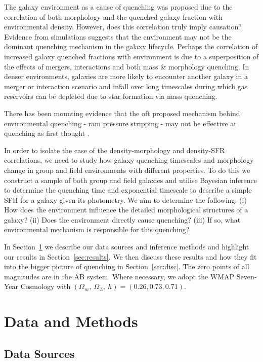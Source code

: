 \documentclass[useAMS,usenatbib]{mn2e}
\begin{document}
 The galaxy environment as a cause of quenching was proposed due to the correlation of both morphology \citep{dressler80} and the quenched galaxy fraction \citep{?} with environmental density. However, does this correlation truly imply causation? Evidence from simulations \citep{?} suggests that the environment may not be the dominant quenching mechanism in the galaxy lifecycle. Perhaps the correlation of increased galaxy quenched fractions with environment is due to a superposition of the effects of mergers, interactions and both mass \& morphology quenching. In denser environments, galaxies are more likely to encounter another galaxy in a merger or interaction scenario and infall over long timescales during which gas reservoirs can be depleted due to star formation via mass quenching.
 
There has been mounting evidence that the oft proposed mechanism behind environmental quenching - ram pressure stripping \citep{?} - may not be effective at quenching as first thought \citep{}. 
 
In order to isolate the case of the density-morphology and density-SFR correlations, we need to study how galaxy quenching timescales and morphology change in group and field environments with different properties. To do this we construct a sample of both group and field galaxies and utilise Bayesian inference to determine the quenching time and exponential timescale to describe a simple SFH for a galaxy given its photometry. We aim to determine the following: (i) How does the environment influence the detailed morphological structures of a galaxy?  (ii) Does the environment directly cause quenching? (iii) If so, what environmental mechanism is responsible for this quenching?

In Section~\ref{sec:data} we describe our data sources and inference methods and highlight our results in Section~\ref{sec:results}. We then discuss these results and how they fit into the bigger picture of quenching in Section~\ref{sec:disc}. The zero points of all magnitudes are in the AB system. Where necessary, we adopt the WMAP Seven-Year Cosmology \citep{jarosik11} with $(\Omega_m , ~\Omega_\Lambda , ~h) = (0.26, 0.73, 0.71)$.

 
\section{Data and Methods}\label{sec:data}

\subsection{Data Sources}\label{sec:photo}
\end{document}
